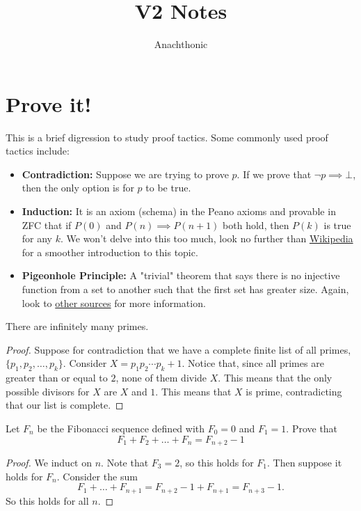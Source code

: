 \documentclass[11pt]{scrreport}
\begin{document}
\title{V2 Notes}
\author{Anachthonic}
\tableofcontents
\maketitle
\setcounter{chapter}{-1}
\chapter{Prove it!}
This is a brief digression to study proof tactics.
Some commonly used proof tactics include:
\begin{itemize}
    \item \textbf{Contradiction:} Suppose we are trying to prove $p$. If we prove that $\neg p \implies \bot$, then the only option is for $p$ to be true.
    \item \textbf{Induction:} It is an axiom (schema) in the Peano axioms and provable in ZFC that if $P(0)$ and $P(n)\implies P(n+1)$ both hold, then $P(k)$ is true for any $k$. We won't delve into this too much, look no further than \href{https://en.wikipedia.org/wiki/Mathematical_induction}{Wikipedia} for a smoother introduction to this topic.
    \item \textbf{Pigeonhole Principle:} A "trivial" theorem that says there is no injective function from a set to another such that the first set has greater size. Again, look to \href{https://en.wikipedia.org/wiki/Pigeonhole_principle}{other sources} for more information.
\end{itemize}
\begin{theorem}
    There are infinitely many primes.
\end{theorem}
\begin{proof}
    Suppose for contradiction that we have a complete finite list of all primes, $\{p_1,p_2,\dots,p_k\}$. Consider $X=p_1p_2\cdots p_k + 1$. Notice that, since all primes are greater than or equal to $2$, none of them divide $X$. This means that the only possible divisors for $X$ are $X$ and $1$. This means that $X$ is prime, contradicting that our list is complete.
\end{proof}
\begin{proposition}
    Let $F_n$ be the Fibonacci sequence defined with $F_0=0$ and $F_1=1$. Prove that \[F_1+F_2+\dots+F_n = F_{n+2}-1\]
\end{proposition}
\begin{proof}
    We induct on $n$. Note that $F_3 = 2$, so this holds for $F_1$. Then suppose it holds for $F_n$. Consider the sum \[F_1+\dots + F_{n+1} = F_{n+2}-1 + F_{n+1} = F_{n+3}-1.\] So this holds for all $n$.
\end{proof}
\end{document}
